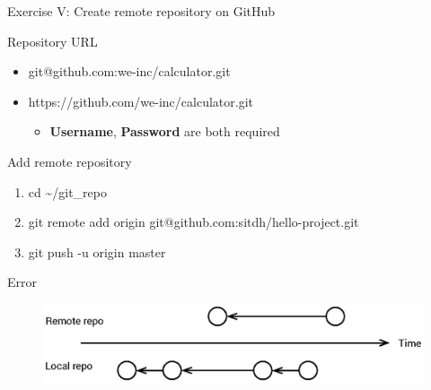 \documentclass{beamer}
\begin{document}
\begin{frame}{Exercise V: Create remote repository on GitHub}
\end{frame}

\begin{frame}{Repository URL}
    \begin{itemize}
        \item<1-> \Large{git@github.com:we-inc/calculator.git}
        \item<1-> \Large{https://github.com/we-inc/calculator.git}
        \begin{itemize}
            \item<2-> \Large{\textbf{Username}, \textbf{Password} are both required}
        \end{itemize}
    \end{itemize}
\end{frame}

\begin{frame}{Add remote repository}
    \begin{enumerate}[\$]
        \item \Large{cd {\textasciitilde}/git\_repo}
        \item \Large{git remote add origin git@github.com:sitdh/hello-project.git}
        \item \Large{git push -u origin master}
    \end{enumerate}
\end{frame}

\begin{frame}{Error}
    \begin{figure}
        \center
        \includegraphics[width=\textwidth]{git-unrelated-histories}
        \label{fig:git-unrelated-histories}
    \end{figure}
\end{frame}
\end{document}
